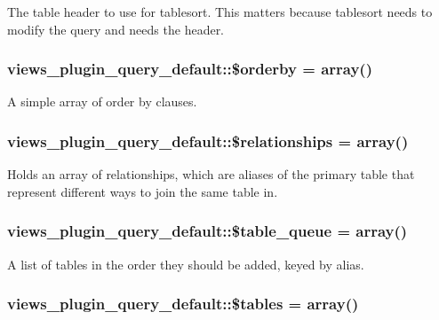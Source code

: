 \label{classviews__plugin__query__default_ac3fc642ec03905693aefc021f5550052}
The table header to use for tablesort. This matters because tablesort needs to modify the query and needs the header. \hypertarget{classviews__plugin__query__default_a6f6e7838215c13cab0a81089370a912c}{
\subsubsection[{\$orderby}]{\setlength{\rightskip}{0pt plus 5cm}views\_\-plugin\_\-query\_\-default::\$orderby = array()}}
\label{classviews__plugin__query__default_a6f6e7838215c13cab0a81089370a912c}
A simple array of order by clauses. \hypertarget{classviews__plugin__query__default_a80a77249462e17b745fa167f9fca5177}{
\subsubsection[{\$relationships}]{\setlength{\rightskip}{0pt plus 5cm}views\_\-plugin\_\-query\_\-default::\$relationships = array()}}
\label{classviews__plugin__query__default_a80a77249462e17b745fa167f9fca5177}
Holds an array of relationships, which are aliases of the primary table that represent different ways to join the same table in. \hypertarget{classviews__plugin__query__default_a8b9c8d35f8f58604b6ba179df43901ce}{
\subsubsection[{\$table\_\-queue}]{\setlength{\rightskip}{0pt plus 5cm}views\_\-plugin\_\-query\_\-default::\$table\_\-queue = array()}}
\label{classviews__plugin__query__default_a8b9c8d35f8f58604b6ba179df43901ce}
A list of tables in the order they should be added, keyed by alias. \hypertarget{classviews__plugin__query__default_a11b47da6c7d595ee69d8b9a7e2dffcb2}{
\subsubsection[{\$tables}]{\setlength{\rightskip}{0pt plus 5cm}views\_\-plugin\_\-query\_\-default::\$tables = array()}}
